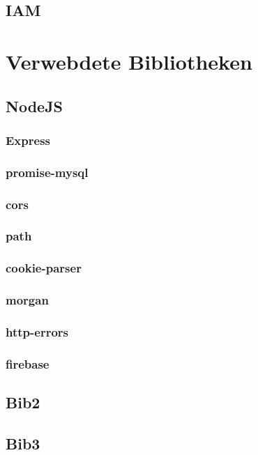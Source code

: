 \subsection{IAM}
\blindtext

\section{Verwebdete Bibliotheken}
\subsection{NodeJS}
\sblindtext
\subsubsection{Express}
\sblindtext
\subsubsection{promise-mysql}
\sblindtext
\subsubsection{cors}
\sblindtext
\subsubsection{path}
\sblindtext
\subsubsection{cookie-parser}
\sblindtext
\subsubsection{morgan}
\sblindtext
\subsubsection{http-errors}
\sblindtext
\subsubsection{firebase}
\sblindtext

\subsection{Bib2}
\sblindtext

\subsection{Bib3}
\sblindtext

